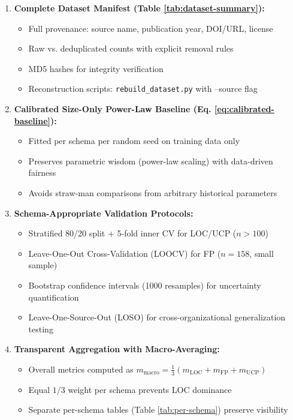 \documentclass[11pt,a4paper]{article}
\begin{document}
\begin{enumerate}[leftmargin=2em]
    \item \textbf{Complete Dataset Manifest (Table \ref{tab:dataset-summary}):} 
    \begin{itemize}
        \item Full provenance: source name, publication year, DOI/URL, license
        \item Raw vs. deduplicated counts with explicit removal rules
        \item MD5 hashes for integrity verification
        \item Reconstruction scripts: \texttt{rebuild\_dataset.py} with --source flag
    \end{itemize}
    
    \item \textbf{Calibrated Size-Only Power-Law Baseline (Eq. \ref{eq:calibrated-baseline}):}
    \begin{itemize}
        \item Fitted per schema per random seed on training data only
        \item Preserves parametric wisdom (power-law scaling) with data-driven fairness
        \item Avoids straw-man comparisons from arbitrary historical parameters
    \end{itemize}
    
    \item \textbf{Schema-Appropriate Validation Protocols:}
    \begin{itemize}
        \item Stratified 80/20 split + 5-fold inner CV for LOC/UCP ($n > 100$)
        \item Leave-One-Out Cross-Validation (LOOCV) for FP ($n = 158$, small sample)
        \item Bootstrap confidence intervals (1000 resamples) for uncertainty quantification
        \item Leave-One-Source-Out (LOSO) for cross-organizational generalization testing
    \end{itemize}
    
    \item \textbf{Transparent Aggregation with Macro-Averaging:}
    \begin{itemize}
        \item Overall metrics computed as $m_{\text{macro}} = \frac{1}{3}(m_{\text{LOC}} + m_{\text{FP}} + m_{\text{UCP}})$
        \item Equal $1/3$ weight per schema prevents LOC dominance
        \item Separate per-schema tables (Table \ref{tab:per-schema}) preserve visibility
    \end{itemize}
\end{enumerate}
\end{document}
